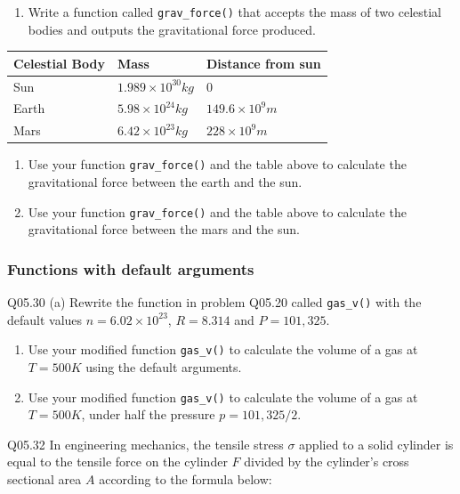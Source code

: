 \documentclass{book}
\providecommand{\tightlist}{%
      \setlength{\itemsep}{0pt}\setlength{\parskip}{0pt}}
\begin{document}
\begin{enumerate}
\def\labelenumi{(\alph{enumi})}
\tightlist
\item
  Write a function called \lstinline!grav_force()! that accepts the mass
  of two celestial bodies and outputs the gravitational force produced.
\end{enumerate}

\begin{longtable}[]{@{}lll@{}}
\toprule
Celestial Body & Mass & Distance from sun\tabularnewline
\midrule
\endhead
Sun & \(1.989\times10^{30} kg\) & \(0\)\tabularnewline
Earth & \(5.98\times10^{24} kg\) &
\(149.6 \times 10^9 m\)\tabularnewline
Mars & \(6.42\times10^{23} kg\) & \(228 \times 10^9 m\)\tabularnewline
\bottomrule
\end{longtable}

\begin{enumerate}
\def\labelenumi{(\alph{enumi})}
\setcounter{enumi}{1}
\item
  Use your function \lstinline!grav_force()! and the table above to
  calculate the gravitational force between the earth and the sun.
\item
  Use your function \lstinline!grav_force()! and the table above to
  calculate the gravitational force between the mars and the sun.
\end{enumerate}
    




    
        \subsubsection{Functions with default
arguments}\label{functions-with-default-arguments}

Q05.30 (a) Rewrite the function in problem Q05.20 called
\lstinline!gas_v()! with the default values \(n = 6.02 \times 10^{23}\),
\(R = 8.314\) and \(P = 101,325\).

\begin{enumerate}
\def\labelenumi{(\alph{enumi})}
\item
  Use your modified function \lstinline!gas_v()! to calculate the volume
  of a gas at \(T = 500 K\) using the default arguments.
\item
  Use your modified function \lstinline!gas_v()! to calculate the volume
  of a gas at \(T = 500K\), under half the pressure \(p = 101,325/2\).
\end{enumerate}

Q05.32 In engineering mechanics, the tensile stress \(\sigma\) applied
to a solid cylinder is equal to the tensile force on the cylinder \(F\)
divided by the cylinder's cross sectional area \(A\) according to the
formula below:
\end{document}
